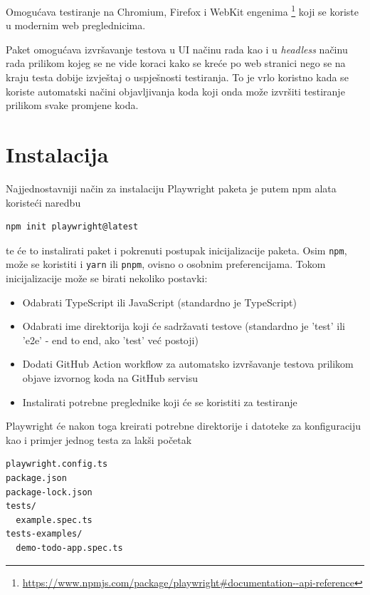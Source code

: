 Omogućava testiranje na Chromium, Firefox i WebKit engenima \footnote{\url{https://www.npmjs.com/package/playwright\#documentation--api-reference}} koji se koriste u modernim web preglednicima.

Paket omogućava izvršavanje testova u UI načinu rada kao i u \emph{headless} načinu rada prilikom kojeg se ne vide koraci kako se kreće po web stranici nego se na kraju testa dobije izvještaj o uspješnosti testiranja.
To je vrlo koristno kada se koriste automatski načini objavljivanja koda koji onda može izvršiti testiranje prilikom svake promjene koda.

\section{Instalacija}

Najjednostavniji način za instalaciju Playwright paketa je putem npm alata koristeći naredbu
\begin{verbatim}
npm init playwright@latest
\end{verbatim}
te će to instalirati paket i pokrenuti postupak inicijalizacije paketa.
Osim \texttt{npm}, može se koristiti i \texttt{yarn} ili \texttt{pnpm}, ovisno o osobnim preferencijama.
Tokom inicijalizacije može se birati nekoliko postavki:
\begin{itemize}
    \item Odabrati TypeScript ili JavaScript (standardno je TypeScript)
    \item Odabrati ime direktorija koji će sadržavati testove (standardno je 'test' ili 'e2e' - end to end, ako 'test' već postoji)
    \item Dodati GitHub Action workflow za automatsko izvršavanje testova prilikom objave izvornog koda na GitHub servisu
    \item Instalirati potrebne preglednike koji će se koristiti za testiranje
    
\end{itemize}

Playwright će nakon toga kreirati potrebne direktorije i datoteke za konfiguraciju kao i primjer jednog testa za lakši početak
\begin{verbatim}
playwright.config.ts
package.json
package-lock.json
tests/
  example.spec.ts
tests-examples/
  demo-todo-app.spec.ts
\end{verbatim}

